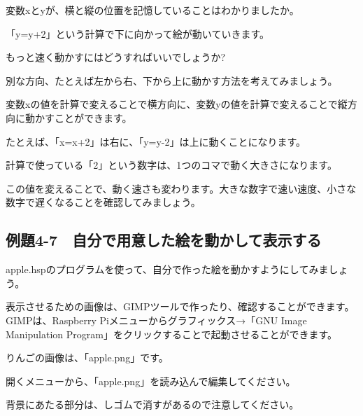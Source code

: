 変数xとyが、横と縦の位置を記憶していることはわかりましたか。

「y=y+2」という計算で下に向かって絵が動いていきます。

もっと速く動かすにはどうすればいいでしょうか?

別な方向、たとえば左から右、下から上に動かす方法を考えてみましょう。


\begin{description}
    \item {}
\end{description}



変数xの値を計算で変えることで横方向に、変数yの値を計算で変えることで縦方向に動かすことができます。

たとえば、「x=x+2」は右に、「y=y-2」は上に動くことになります。

計算で使っている「2」という数字は、1つのコマで動く大きさになります。

この値を変えることで、動く速さも変わります。大きな数字で速い速度、小さな数字で遅くなることを確認してみましょう。


\newpage
\subsection{例題4-7　自分で用意した絵を動かして表示する}


\begin{description}
    \item {}
\end{description}



apple.hspのプログラムを使って、自分で作った絵を動かすようにしてみましょう。

表示させるための画像は、GIMPツールで作ったり、確認することができます。GIMPは、Raspberry
Piメニューからグラフィックス→「GNU Image Manipulation Program」をクリックすることで起動させることができます。

りんごの画像は、「apple.png」です。

開くメニューから、「apple.png」を読み込んで編集してください。

背景にあたる部分は、しゴムで消すがあるので注意してください。


